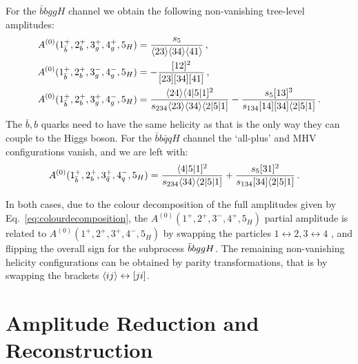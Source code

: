 \documentclass[main.tex]{subfiles}
\begin{document}
For the $\bar{b} b g g H$ channel we obtain the following non-vanishing tree-level amplitudes:
\begin{align} \label{eq:A0bbggh}
	A^{(0)}(1^+_{\bar{b}},2^+_{b},3^+_g,4^+_g,5_{H}) &=  \frac{s_5}{\langle23\rangle \langle34\rangle \langle41\rangle} \,, \\
	A^{(0)}(1^+_{\bar{b}},2^+_{b},3^-_g,4^-_g,5_{H}) &= -\frac{[12]^2}{[23][34][41]} \,, \\
	A^{(0)}(1^+_{\bar{b}},2^+_{b},3^+_g,4^-_g,5_{H}) &= \frac{\langle24\rangle \langle4|5|1]^2}{s_{234} \langle23\rangle \langle34\rangle \langle2|5|1]}-\frac{s_5 [13]^3}{s_{134} [14] [34] \langle2|5|1]} \,.
\end{align}
The $\bar{b},b$ quarks need to have the same helicity as that is the only way they can couple to the Higgs boson. 
For the $\bar{b} b \bar{q} q H$ channel the `all-plus' and MHV configurations vanish, and we are left with:
\begin{align} \label{eq:A0bbqqh}
	A^{(0)}(1^+_{\bar b},2^+_{b},3^+_{\bar q},4^-_{q},5_{H}) &=  \frac{\langle4|5|1]^2}{s_{234} \langle34\rangle \langle2|5|1]}+\frac{s_5 [31]^2}{s_{134} [34] \langle2|5|1]} \,. 
\end{align}

In both cases, due to the colour decomposition of the full amplitudes given by Eq.~\ref{eq:colourdecomposition}, the $A^{(0)}(1^+,2^+,3^-,4^+,5_{H})$ partial amplitude is related to $A^{(0)}(1^+,2^+,3^+,4^-,5_{H})$ by swapping the particles $1\leftrightarrow 2,3\leftrightarrow 4$ , and flipping the overall sign for the subprocess $\bar{b}bggH$. The remaining non-vanishing helicity configurations can be obtained by parity transformations, that is by swapping the brackets $\langle ij \rangle \leftrightarrow [ji]$.

\section{Amplitude Reduction and Reconstruction}
\label{Hbbsec:reduction}
\end{document}
